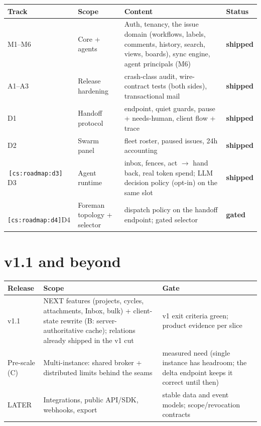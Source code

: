 \documentclass[11pt,a4paper]{report}
\newcommand{\cs}[1]{\,\texttt{\scriptsize[cs:#1]}\label{cs:#1}}
\newcommand{\shipped}{\textbf{\textcolor{green!45!black}{shipped}}}
\newcommand{\gated}{\textbf{\textcolor{purple!60!black}{gated}}}
\begin{document}
\begin{center}
\begin{longtable}{@{}p{}p{}p{}l@{}}
\toprule
\textbf{Track} & \textbf{Scope} & \textbf{Content} & \textbf{Status}\\
\midrule
\endhead
M1--M6 & Core + agents & Auth, tenancy, the issue domain
  (workflows, labels, comments, history, search, views, boards), sync
  engine, agent principals (M6) & \shipped\\
A1--A3 & Release hardening & crash-class audit, wire-contract tests
  (both sides), transactional mail & \shipped\\
D1 & Handoff protocol & endpoint, quiet guards, pause + needs-human,
  client flow + trace & \shipped\\
D2 & Swarm panel & fleet roster, paused issues, 24h accounting & \shipped\\
\cs{roadmap:d3} D3 & Agent runtime & inbox, fences, act $\to$ hand
  back, real token spend; LLM decision policy (opt-in) on the same slot &
  \shipped\\
\cs{roadmap:d4} D4 & Foreman topology + selector & dispatch policy on the
  handoff endpoint; gated selector & \gated\\
\bottomrule
\end{longtable}
\end{center}

\section{v1.1 and beyond}

\begin{center}
\begin{longtable}{@{}lp{}p{}@{}}
\toprule
\textbf{Release} & \textbf{Scope} & \textbf{Gate}\\
\midrule
v1.1 & NEXT features (projects, cycles, attachments, Inbox, bulk) +
  client-state rewrite (B: server-authoritative cache); relations already
  shipped in the v1 cut & v1 exit
  criteria green; product evidence per slice\\
Pre-scale (C) & Multi-instance: shared broker + distributed limits behind
  the seams & measured need (single instance has headroom; the delta
  endpoint keeps it correct until then)\\
LATER & Integrations, public API/SDK, webhooks, export & stable data and
  event models; scope/revocation contracts\\
\bottomrule
\end{longtable}
\end{center}
\end{document}
